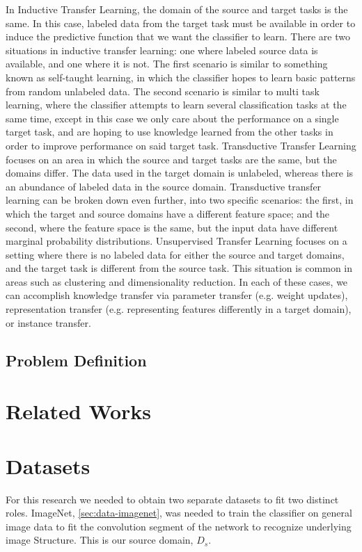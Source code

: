 \documentclass[10pt,twocolumn,letterpaper]{article}
\begin{document}
In Inductive Transfer Learning, the domain of the source and target tasks is the same. In this case, labeled data
from the target task must be available in order to induce the predictive function that we want the classifier to learn.
There are two situations in inductive transfer learning: one where labeled source data is available, and one where it
is not. The first scenario is similar to something known as self-taught learning, in which the classifier hopes to
learn basic patterns from random unlabeled data. The second scenario is similar to multi task learning, where the
classifier attempts to learn several classification tasks at the same time, except in this case we only care about
the performance on a single target task, and are hoping to use knowledge learned from the other tasks in order to
improve performance on said target task.
Transductive Transfer Learning focuses on an area in which the source and target tasks are the same, but the domains
differ. The data used in the target domain is unlabeled, whereas there is an abundance of labeled data in the source
domain. Transductive transfer learning can be broken down even further, into two specific scenarios: the first, in
which the target and source domains have a different feature space; and the second, where the feature space is the
same, but the input data have different marginal probability distributions.
Unsupervised Transfer Learning focuses on a setting where there is no labeled data for either the source and target
domains, and the target task is different from the source task. This situation is common in areas such as clustering
and dimensionality reduction.
In each of these cases, we can accomplish knowledge transfer via parameter transfer (e.g. weight updates),
representation transfer (e.g. representing features differently in a target domain), or instance transfer.


   \subsection{Problem Definition} \label{sec:intro-def}

\section{Related Works} \label{sec:works}

\section{Datasets} \label{sec:data}
   For this research we needed to obtain two separate datasets to fit two
   distinct roles. ImageNet, \ref{sec:data-imagenet}, was needed to train
   the classifier on general image data to fit the convolution segment of
   the network to recognize underlying image Structure. This is our source
   domain, $D_s$.
\end{document}
